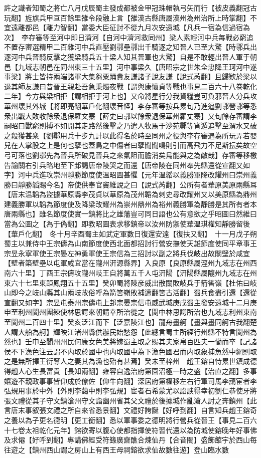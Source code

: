許之識者知蜀之將亡八月戊辰蜀主發成都被金甲冠珠帽執弓矢而行【被皮義翻冠古玩翻】旌旗兵甲亘百餘里雒令段融上言【雒漢古縣唐屬漢州為州治所上時掌翻】不宜遠離都邑【離力智翻】當委大臣征討不從九月次安遠城【凡兵一宿為信過宿為次】　李存審等至河中即日濟河【自河中濟河救同州】梁人素輕河中兵每戰必窮追不置存審選精甲二百雜河中兵直壓劉鄩壘鄩出千騎逐之知晉人已至大驚【時鄩兵出逐河中兵晉騎反擊之獲梁騎兵五十梁人知其晉軍也大驚】自是不敢輕出晉人軍于朝邑【九域志朝邑在同州東三十五里】河中事梁久【唐昭宗之世朱全忠降王珂河中遂事梁】將士皆持兩端諸軍大集芻粟踊貴友謙諸子說友謙【說式芮翻】且歸欵於梁以退其師友謙曰昔晉王親赴吾急秉燭夜戰【謂與康懷貞等戰也事見二百六十八卷乾化二年】今方與梁相拒【謂相拒于河上也】又命將星行分我資糧豈可負邪晉人分兵攻華州壞其外城【將即亮翻華戶化翻壞音怪】李存審等按兵累旬乃進逼劉鄩營鄩等悉衆出戰大敗收餘衆退保羅文寨【薛史曰鄩以餘衆退保華州羅丈寨】又旬餘存審謂李嗣昭曰獸窮則搏不如開其走路然後擊之乃遣人牧馬于沙苑鄩等宵遁追擊至渭水又破之殺獲甚衆【劉鄩用兵十步九計以此得名於時至同州之役與李存審遇為所玩弄若嬰兒在人掌股之上是何也孽也蓋鳥之中傷者曰孽聞聞鳴則引而高飛力不足斯抎矣故空弓可落也劉鄩先為晉兵所破見晉兵之來氣阻而膽消矣烏能與之為敵哉】存審等移檄告諭關右引兵略地至下邽謁唐帝陵哭之而還【唐帝陵在同州奉先縣還從宣翻又如字】河中兵進攻崇州靜勝節度使温昭圖甚懼【元年温韜以義勝軍降改耀州曰崇州義勝曰靜勝韜賜今名】帝使供奉官竇維說之曰【說式芮翻】公所有者華原美原兩縣耳【唐末温韜為盜據華原縣李茂貞以華原為茂州韜為刺史尋改耀州又以美原縣為鼎州建義勝軍以韜為節度使及降梁改耀州為崇州鼎州為裕州義勝軍為靜勝是其所有者本唐兩縣也】雖名節度使實一鎮將比之雄藩豈可同日語也公有意欲之乎昭圖曰然維曰當為公圖之【為于偽翻】即教昭圖表求移鎮帝以汝州防禦使華温琪權知靜勝留後【華戶化翻】　冬十月辛酉蜀主如武定軍數日復還安遠【復扶又翻】　十一月戊子朔蜀主以兼侍中王宗儔為山南節度使西北面都招討行營安撫使天雄節度使同平章事王宗昱永寧軍使王宗晏左神勇軍使王宗信為三招討以副之將兵伐岐出故關壁於咸宜【壁者築壁壘以屯軍咸宜當在隴州汧源縣界】入良原【良原縣屬涇州九域志在州西南六十里】丁酉王宗儔攻隴州岐王自將萬五千人屯汧陽【汧陽縣屬隴州九域志在州東六十七里東距鳳翔五十五里】癸卯蜀將陳彦威出散關敗岐兵于箭筈嶺【杜佑曰岐山即今之岐山縣其山兩岐故俗呼為箭筈嶺敗補邁翻筈古活翻】蜀兵食盡引還【還從宣翻又如字】宗昱屯泰州宗儔屯上邽宗晏宗信屯威武城庚戌蜀主發安遠城十二月庚申至利州閬州團練使林思諤來朝請幸所治從之【閬中林思諤所治也九域志利州東南至閬州二百四十里】癸亥泛江而下【泛嘉陵江也】龍舟畫舸【畫與畫同舸古我翻楚人謂大船為舸】輝映江渚州縣供辦民始愁怨【此總言蜀主所經行州縣不特言閬州為然也】壬申至閬州州民何康女色美將嫁蜀主取之賜其夫家帛百匹夫一慟而卒【記諸侯不下漁色注云謂不内取於國中也内取國中為下漁色國君而内取象捕魚然中網則取之是無所擇王衍奪人之妻其為漁也殆有甚焉】癸未至梓州　趙王鎔自恃累世鎮成德得趙人心生長富貴【長知兩翻】雍容自逸治府第園沼極一時之盛【治直之翻】多事嬉遊不親政事事皆仰成於僚佐【仰牛向翻】深居府第權移左右行軍司馬李藹宦者李弘規用事於中外【外則李藹中則李弘規】宦者石希蒙尤以諂諛得幸初劉仁恭使牙將張文禮從其子守文鎮滄州守文詣幽州省其父文禮於後據城作亂滄人討之奔鎮州【此言唐末事叙張文禮之所自來省悉景翻】文禮好誇誕【好呼到翻】自言知兵趙王鎔奇之養以為子更名德明【更工衡翻】悉以軍事委之德明將行營兵從晉王【事見二百六十七卷太祖乾化元年】鎔欲寄以腹心使都指揮使符習代還以為防城使鎔晚年好事佛及求僊【好呼到翻】專講佛經受符籙廣齋醮合煉仙丹【合音閤】盛飾館宇於西山每往遊之【鎮州西山謂之房山上有西王母祠鎔欲求仙故數往遊】登山臨水數